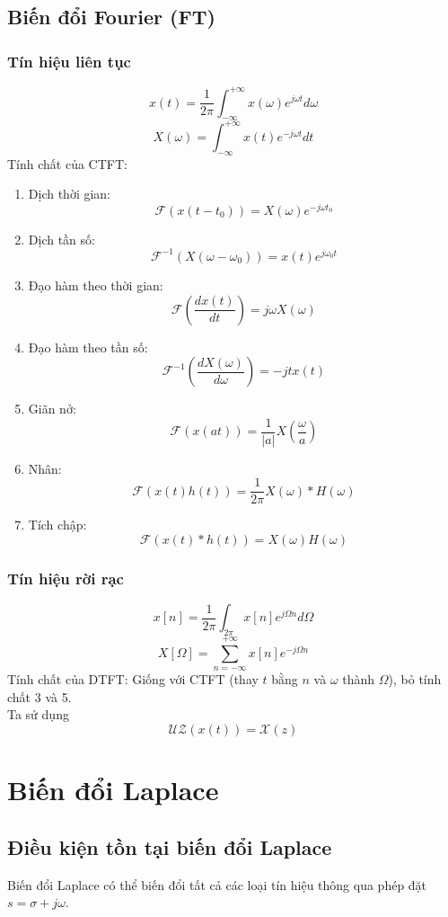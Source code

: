 \documentclass{article}
\begin{document}
\subsection{Biến đổi Fourier (FT)}
\subsubsection{Tín hiệu liên tục}
$$x(t)=\frac{1}{2\pi}\int_{-\infty}^{+\infty}x(\omega)e^{j\omega t}d\omega$$
$$X(\omega)=\int_{-\infty}^{+\infty}x(t)e^{-j\omega t}dt$$
Tính chất của CTFT:
\begin{enumerate}
    \item Dịch thời gian: $$\mathscr{F}({x(t-t_{0})})=X(\omega)e^{-j\omega t_{0}}$$
    \item Dịch tần số: $$\mathscr{F}^{-1}(X(\omega-\omega_{0}))=x(t)e^{j\omega_{0}t}$$
    \item Đạo hàm theo thời gian: $$\mathscr{F}\left(\frac{dx(t)}{dt}\right)=j\omega X(\omega)$$
    \item Đạo hàm theo tần số: $$\mathscr{F}^{-1}\left(\frac{dX(\omega)}{d\omega}\right)=-jtx(t)$$
    \item Giãn nở: $$\mathscr{F}(x(at))=\frac{1}{|a|}X\left(\frac{\omega}{a}\right)$$
    \item Nhân: $$\mathscr{F}{(x(t)h(t))}=\frac{1}{2\pi}X(\omega)*H(\omega)$$
    \item Tích chập: $$\mathscr{F}(x(t)*h(t))=X(\omega)H(\omega)$$
\end{enumerate}
\subsubsection{Tín hiệu rời rạc}
$$x[n]=\frac{1}{2\pi}\int_{2\pi}x[n]e^{j\Omega n}d\Omega$$
$$X[\Omega]=\sum_{n=-\infty}^{+\infty}x[n]e^{-j\Omega n}$$
Tính chất của DTFT: Giống với CTFT (thay $t$ bằng $n$ và $\omega$ thành $\Omega$), bỏ tính chất 3 và 5.
\\Ta sử dụng $$\mathscr{UZ}(x(t))=\mathscr{X}(z)$$
\section{Biến đổi Laplace}
\subsection{Điều kiện tồn tại biến đổi Laplace}
Biến đổi Laplace có thể biến đổi tất cả các loại tín hiệu thông qua phép đặt $s=\sigma+j\omega$.
\end{document}
